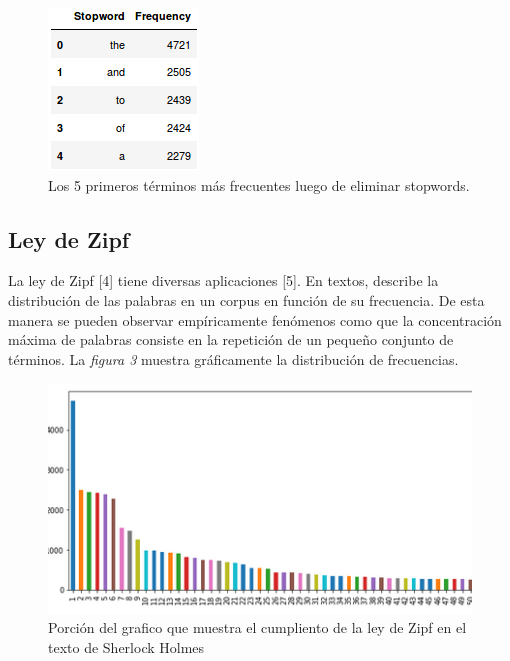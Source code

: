\documentclass[conference]{IEEEtran}
\begin{document}
\begin{figure}
\begin{center}
\includegraphics[scale=0.5]{img/3.png}
\end{center}
\caption{Los 5 primeros términos más frecuentes luego de eliminar stopwords.}
\end{figure}
\subsection{Ley de Zipf}
La ley de Zipf [4] tiene diversas aplicaciones [5]. En textos, describe la distribución de las palabras en un corpus en función de su frecuencia. De esta manera se pueden observar empíricamente fenómenos como que la concentración máxima de palabras consiste en la repetición de un pequeño conjunto de términos. La \textit{figura 3} muestra gráficamente la distribución de frecuencias.
\begin{figure}
\begin{center}
\includegraphics[scale=0.5]{img/4.png} 
\end{center}
\caption{Porción del grafico que muestra el cumpliento de la ley de Zipf en el texto de Sherlock Holmes}
\end{figure}
\end{document}
